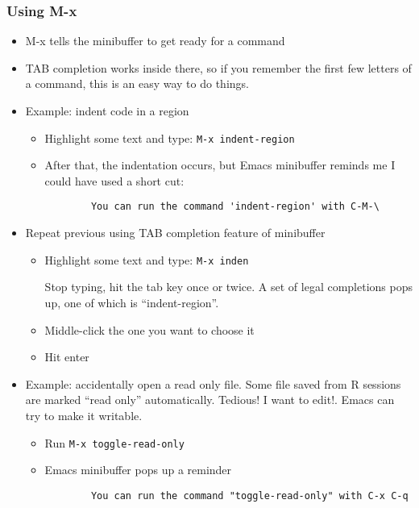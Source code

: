 \documentclass[11pt,english]{beamer}
\begin{document}
\begin{frame}
  \frametitle{Using M-x}
  \begin{itemize}
  \item M-x tells the minibuffer to get ready for a command
  \item TAB completion works inside there, so if you remember the first few
    letters of a command, this is an easy way to do things.
  \item Example: indent code in a region

    \begin{itemize}
    \item Highlight some text and type: \lstinline!M-x indent-region!
    \item After that, the indentation occurs, but Emacs minibuffer reminds me
      I could have used a short cut:


      \begin{lstlisting}
        You can run the command 'indent-region' with C-M-\
      \end{lstlisting}


    \end{itemize}
  \item Repeat previous using TAB completion feature of minibuffer

    \begin{itemize}
    \item Highlight some text and type: \lstinline!M-x inden!


      Stop typing, hit the tab key once or twice. A set of legal completions
      pops up, one of which is ``indent-region''. 

    \item Middle-click the one you want to choose it
    \item Hit enter
    \end{itemize}
  \item Example: accidentally open a read only file. Some file saved from
    R sessions are marked ``read only'' automatically. Tedious! I want
    to edit!. Emacs can try to make it writable.

    \begin{itemize}
    \item Run \lstinline!M-x toggle-read-only!
    \item Emacs minibuffer pops up a reminder 
      \begin{lstlisting}
        You can run the command "toggle-read-only" with C-x C-q
      \end{lstlisting}



\end{itemize}
\end{itemize}
\end{frame}
\end{document}
